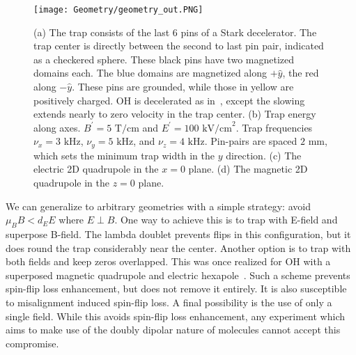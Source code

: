 \documentclass[%
 reprint,
groupedaddress,
 amsmath,amssymb,
 aps,
prl,
]{revtex4-1}
\newcommand{\epb}{{$E\!\perp\!B$}}
\begin{document}
\begin{figure}[tb]
\texttt{[image: Geometry/geometry\_out.PNG]}%
\caption{
(a) The trap consists of the last 6 pins of a Stark decelerator. The trap center is directly between the second to last pin pair, indicated as a checkered sphere. These black pins have two magnetized domains each. The blue domains are magnetized along $+\hat{y}$, the red along $-\hat{y}$. These pins are grounded, while those in yellow are positively charged. OH is decelerated as in~\cite{Sawyer2008}, except the slowing extends nearly to zero velocity in the trap center. (b) Trap energy along axes. $B^\prime=5\text{ T/cm}$ and $E^\prime=100 \text{ kV/cm}^2$. Trap frequencies $\nu_x=3\text{ kHz}$, $\nu_y=5\text{ kHz}$, and $\nu_z=4\text{ kHz}$. Pin-pairs are spaced $2\text{ mm}$, which sets the minimum trap width in the $y$ direction. (c) The electric 2D quadrupole in the $x=0$ plane. (d) The magnetic 2D quadrupole in the $z=0$ plane.
\label{fig:CAD}}
\end{figure}

We can generalize to arbitrary geometries with a simple strategy: avoid $\mu_BB < d_EE$ where \epb. One way to achieve this is to trap with E-field and superpose B-field. The lambda doublet prevents flips in this configuration, but it does round the trap considerably near the center. Another option is to trap with both fields and keep zeros overlapped. This was once realized for OH with a superposed magnetic quadrupole and electric hexapole~\cite{Sawyer2007}. Such a scheme prevents spin-flip loss enhancement, but does not remove it entirely. It is also susceptible to misalignment induced spin-flip loss. A final possibility is the use of only a single field. While this avoids spin-flip loss enhancement, any experiment which aims to make use of the doubly dipolar nature of molecules cannot accept this compromise.
\end{document}
